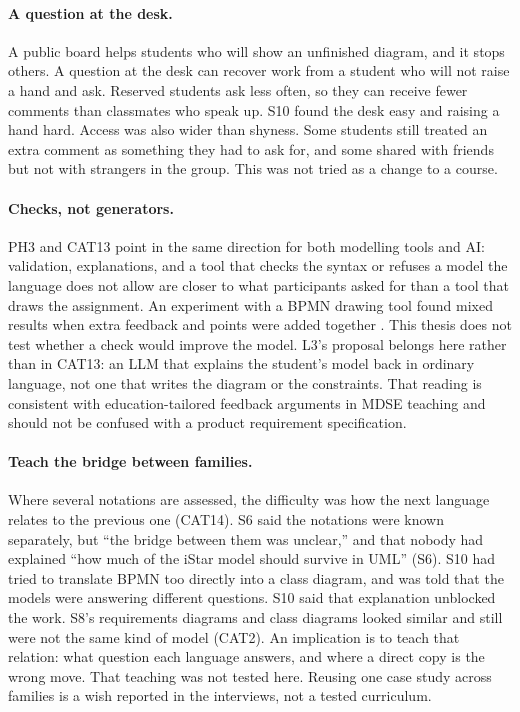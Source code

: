 \paragraph{A question at the desk.}
A public board helps students who will show an unfinished diagram, and it stops others. A question at the desk can recover work from a student who will not raise a hand and ask. Reserved students ask less often, so they can receive fewer comments than classmates who speak up. S10 found the desk easy and raising a hand hard. Access was also wider than shyness. Some students still treated an extra comment as something they had to ask for, and some shared with friends but not with strangers in the group. This was not tried as a change to a course.

\paragraph{Checks, not generators.}
PH3 and CAT13 point in the same direction for both modelling tools and AI: validation, explanations, and a tool that checks the syntax or refuses a model the language does not allow are closer to what participants asked for than a tool that draws the assignment. An experiment with a BPMN drawing tool found mixed results when extra feedback and points were added together \cite{garaccione2024gamification}. This thesis does not test whether a check would improve the model. L3's proposal belongs here rather than in CAT13: an LLM that explains the student's model back in ordinary language, not one that writes the diagram or the constraints. That reading is consistent with education-tailored feedback arguments in MDSE teaching \cite{liebel2017model} and should not be confused with a product requirement specification.

\paragraph{Teach the bridge between families.}
Where several notations are assessed, the difficulty was how the next language relates to the previous one (CAT14). S6 said the notations were known separately, but ``the bridge between them was unclear,'' and that nobody had explained ``how much of the iStar model should survive in UML'' (S6). S10 had tried to translate BPMN too directly into a class diagram, and was told that the models were answering different questions. S10 said that explanation unblocked the work. S8's requirements diagrams and class diagrams looked similar and still were not the same kind of model (CAT2). An implication is to teach that relation: what question each language answers, and where a direct copy is the wrong move. That teaching was not tested here. Reusing one case study across families is a wish reported in the interviews, not a tested curriculum.

